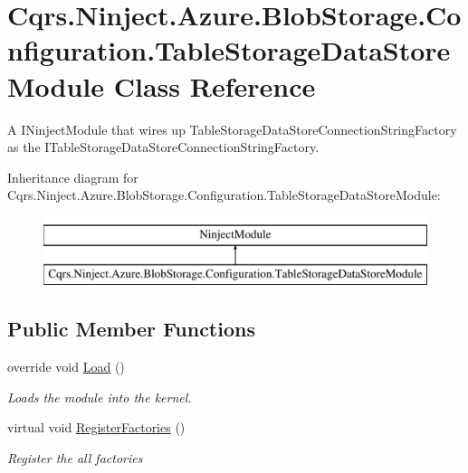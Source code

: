 \hypertarget{classCqrs_1_1Ninject_1_1Azure_1_1BlobStorage_1_1Configuration_1_1TableStorageDataStoreModule}{}\section{Cqrs.\+Ninject.\+Azure.\+Blob\+Storage.\+Configuration.\+Table\+Storage\+Data\+Store\+Module Class Reference}
\label{classCqrs_1_1Ninject_1_1Azure_1_1BlobStorage_1_1Configuration_1_1TableStorageDataStoreModule}


A I\+Ninject\+Module that wires up Table\+Storage\+Data\+Store\+Connection\+String\+Factory as the I\+Table\+Storage\+Data\+Store\+Connection\+String\+Factory.  


Inheritance diagram for Cqrs.\+Ninject.\+Azure.\+Blob\+Storage.\+Configuration.\+Table\+Storage\+Data\+Store\+Module\+:\begin{figure}[H]
\begin{center}
\leavevmode
\includegraphics[height=2.000000cm]{classCqrs_1_1Ninject_1_1Azure_1_1BlobStorage_1_1Configuration_1_1TableStorageDataStoreModule}
\end{center}
\end{figure}
\subsection*{Public Member Functions}
\begin{DoxyCompactItemize}
\item 
override void \hyperlink{classCqrs_1_1Ninject_1_1Azure_1_1BlobStorage_1_1Configuration_1_1TableStorageDataStoreModule_a6001f43d3102af95c34cf7f17757744e_a6001f43d3102af95c34cf7f17757744e}{Load} ()
\begin{DoxyCompactList}\small\item\em Loads the module into the kernel. \end{DoxyCompactList}\item 
virtual void \hyperlink{classCqrs_1_1Ninject_1_1Azure_1_1BlobStorage_1_1Configuration_1_1TableStorageDataStoreModule_a785a2d032063d28d39d0c0f66f5f727f_a785a2d032063d28d39d0c0f66f5f727f}{Register\+Factories} ()
\begin{DoxyCompactList}\small\item\em Register the all factories \end{DoxyCompactList}\end{DoxyCompactItemize}


